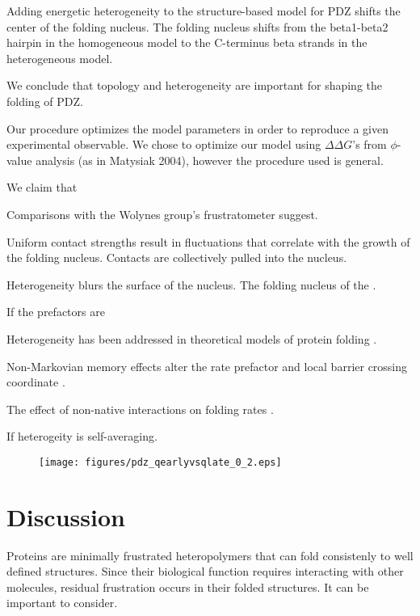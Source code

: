 \documentclass[preprint]{elsarticle}
\begin{document}
Adding energetic heterogeneity to the structure-based model for PDZ shifts the
center of the folding nucleus. The folding nucleus shifts from the beta1-beta2
hairpin in the homogeneous model to the C-terminus beta strands in the
heterogeneous model. 

We conclude that topology and heterogeneity are important for shaping the
folding of PDZ.


    Our procedure optimizes the model parameters in order to reproduce a given
experimental observable. We chose to optimize our model using  $\Delta\Delta
G$'s from $\phi$-value analysis (as in Matysiak 2004), however the procedure
used is general.

We claim that 

Comparisons with the Wolynes group's frustratometer suggest.

Uniform contact strengths result in fluctuations that correlate with
the growth of the folding nucleus. Contacts are collectively pulled into the
nucleus.

Heterogeneity blurs the surface of the nucleus. The folding nucleus of the .

If the prefactors are 


Heterogeneity has been addressed in theoretical models of protein folding \cite{Plotkin2002a}.

Non-Markovian memory effects alter the rate prefactor and local barrier
crossing coordinate \cite{Portman2001,Portman2001a,Plotkin1998}.

The effect of non-native interactions on folding rates \cite{Plotkin2001,Clementi2004}.


If heterogeity is self-averaging.





\begin{figure}
\texttt{[image: figures/pdz\_qearlyvsqlate\_0\_2.eps]}
\end{figure}

\section{Discussion}

    Proteins are minimally frustrated heteropolymers that can fold consistenly
to well defined structures. Since their biological function requires
interacting with other molecules, residual frustration occurs in their folded
structures. It can be important to consider.
\end{document}
